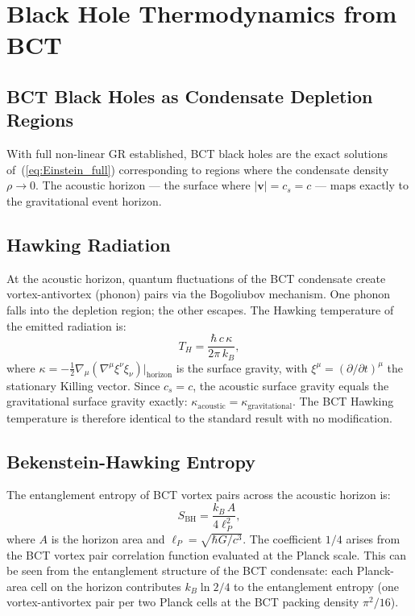 \documentclass[11pt,a4paper]{article}
\theoremstyle{bctthm}
\theoremstyle{definition}
\begin{document}
\section{Black Hole Thermodynamics from BCT}

\subsection{BCT Black Holes as Condensate Depletion Regions}

With full non-linear GR established, BCT black holes are the exact solutions
of~(\ref{eq:Einstein_full}) corresponding to regions where the condensate
density $\rho \to 0$. The acoustic horizon — the surface where $|\mathbf{v}|
= c_s = c$ — maps exactly to the gravitational event horizon.

\subsection{Hawking Radiation}

At the acoustic horizon, quantum fluctuations of the BCT condensate create
vortex-antivortex (phonon) pairs via the Bogoliubov mechanism. One phonon falls
into the depletion region; the other escapes. The Hawking temperature of the
emitted radiation is:
\begin{equation}
T_H = \frac{\hbar\,c\,\kappa}{2\pi\,k_B},
\label{eq:TH}
\end{equation}
where $\kappa = -\tfrac{1}{2}\nabla_\mu(\nabla^\mu\xi^\nu\xi_\nu)|_\mathrm{horizon}$
is the surface gravity, with $\xi^\mu = (\partial/\partial t)^\mu$ the
stationary Killing vector. Since $c_s = c$, the acoustic surface gravity equals
the gravitational surface gravity exactly:
$\kappa_\mathrm{acoustic} = \kappa_\mathrm{gravitational}$.
The BCT Hawking temperature is therefore identical to the standard result
with no modification.

\subsection{Bekenstein-Hawking Entropy}

The entanglement entropy of BCT vortex pairs across the acoustic horizon is:
\begin{equation}
S_\mathrm{BH} = \frac{k_B\,A}{4\ell_P^2},
\label{eq:SBH}
\end{equation}
where $A$ is the horizon area and $\ell_P = \sqrt{\hbar G/c^3}$.
The coefficient $1/4$ arises from the BCT vortex pair correlation function
evaluated at the Planck scale. This can be seen from the entanglement structure
of the BCT condensate: each Planck-area cell on the horizon contributes
$k_B\ln 2 / 4$ to the entanglement entropy (one vortex-antivortex pair per
two Planck cells at the BCT packing density $\pi^2/16$).
\end{document}
